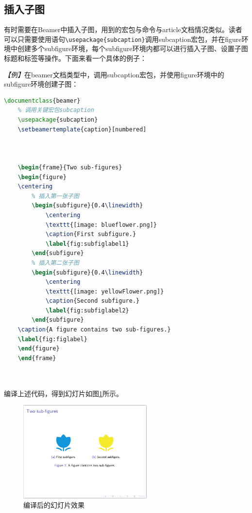 \subsection{插入子图}

有时需要在Beamer中插入子图，用到的宏包与命令与article文档情况类似。读者可以只需要使用语句\texttt{\textbackslash{}usepackage\{subcaption\}}调用subcaption宏包，并在figure环境中创建多个subfigure环境，每个subfigure环境内都可以进行插入子图、设置子图标题和标签等操作。下面来看一个具体的例子：

\emph{【例】}在beamer文档类型中，调用subcaption宏包，并使用figure环境中的subfigure环境创建子图：
\begin{lstlisting}[language=TeX]
    \documentclass{beamer}
    % 调用关键宏包subcaption
    \usepackage{subcaption}
    \setbeamertemplate{caption}[numbered]

    

    \begin{frame}{Two sub-figures}
    \begin{figure}
    \centering
        % 插入第一张子图
        \begin{subfigure}{0.4\linewidth}
            \centering
            \texttt{[image: blueflower.png]}
            \caption{First subfigure.}
            \label{fig:subfiglabel1}
        \end{subfigure}
        % 插入第二张子图
        \begin{subfigure}{0.4\linewidth}
            \centering
            \texttt{[image: yellowFlower.png]}
            \caption{Second subfigure.}
            \label{fig:subfiglabel2}
        \end{subfigure}
    \caption{A figure contains two sub-figures.}
    \label{fig:figlabel}
    \end{figure}
    \end{frame}

    
\end{lstlisting}

编译上述代码，得到幻灯片如图\ref{fig:943}所示。

\begin{figure}[htbp]
    \centering
    \includegraphics[width = 0.6\textwidth]{images/ch_9/eg6_3.png}
    \caption{编译后的幻灯片效果}
    \label{fig:943}
\end{figure}

